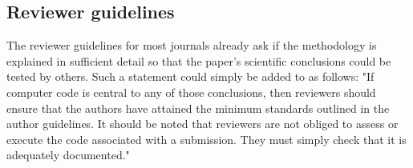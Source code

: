 \subsection{Reviewer guidelines}

The reviewer guidelines for most journals already ask if the methodology is explained in sufficient detail so that the paper's scientific conclusions could be tested by others. Such a statement could simply be added to as follows: "If computer code is central to any of those conclusions, then reviewers should ensure that the authors have attained the minimum standards outlined in the author guidelines. It should be noted that reviewers are not obliged to assess or execute the code associated with a submission. They must simply check that it is adequately documented."   